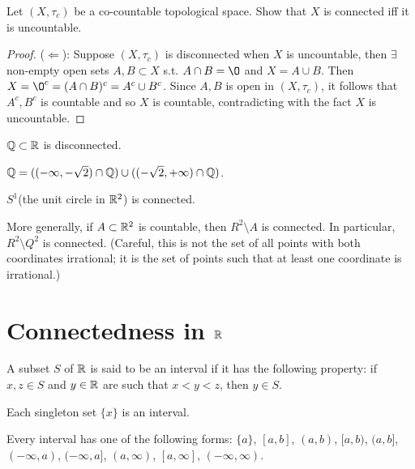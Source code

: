\begin{example}
    Let $(X,\tau_c)$ be a co-countable topological space. 
    Show that $X$ is connected iff it is uncountable.
\end{example}
\begin{proof}
    ($\Leftarrow$):
    Suppose $(X,\tau_c)$ is disconnected when $X$ is uncountable, then 
    $\exists$ non-empty open sets $A,B\subset X$ s.t. $A\cap B=\O$ and $X=A\cup B$.
    Then $X=\O^c=(A\cap B)^c=A^c\cup B^c$. Since $A,B$ is open in $(X,\tau_c)$, 
    it follows that $A^c,B^c$ is countable and so $X$ is countable, 
    contradicting with the fact $X$ is uncountable.
\end{proof}


\begin{example}{}{}
    $\mathbb{Q}\subset \mathbb{R}$ is disconnected.
\end{example}

$\mathbb{Q}=((-\infty, -\sqrt{2})\cap \mathbb{Q})\cup ((-\sqrt{2},+\infty)\cap \mathbb{Q})$.

\begin{example}{}{}
    $S^1$(the unit circle in $\mathbb{R}^2$) is connected.
\end{example}

\begin{example}{}{}
    More generally, if $A \subset \mathbb{R}^2$ is countable, then $R^2 \setminus A$ is connected. 
    In particular, $R^2 \setminus Q^2$ is connected. 
    (Careful, this is not the set of all points with both coordinates irrational; it is
    the set of points such that at least one coordinate is irrational.)
\end{example}

\section{Connectedness in $\mathbb{R}$}

\begin{definition}{}{}
    A subset $S$ of $\mathbb{R}$ is said to be an interval if it has the following property: 
    if $x,z\in S$ and $y\in \mathbb{R}$ are such that $x<y<z$, then $y\in S$.
\end{definition}
\begin{remark}
    Each singleton set $\{x\}$ is an interval.
\end{remark}

\begin{remark}
    Every interval has one of the following forms: 
    $\{a\}$, $[a,b]$, $(a,b)$, $[a,b)$, $(a,b]$, $(-\infty,a)$, $(-\infty,a]$, $(a,\infty)$, $[a,\infty]$, $(-\infty,\infty)$.
\end{remark}


